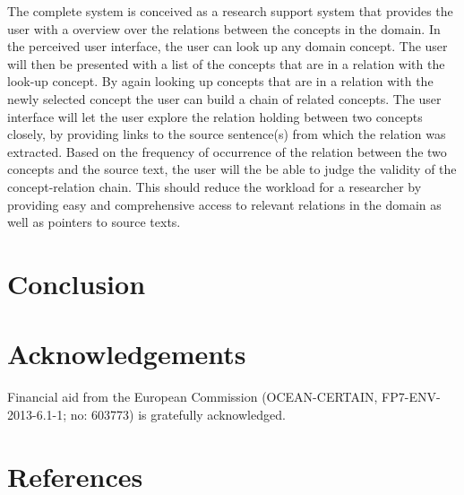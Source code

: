 \documentclass[10pt, a4paper]{article}
\begin{document}
The complete system is conceived as a research support system that provides the user with a overview over the relations between the concepts in the domain. 
In the perceived user interface, the user can look up any domain concept.
The user will then be presented with a list of the concepts that are in a relation with the look-up concept. 
By again looking up concepts that are in a relation with the newly selected concept the user can build a chain of related concepts.
The user interface will let the user explore the relation holding between two concepts closely, by providing links to the source sentence(s) from which the relation was extracted. 
Based on the frequency of occurrence of the relation between the two concepts and the source text, the user will the be able to judge the validity of the concept-relation chain.
This should reduce the workload for a researcher by providing easy and comprehensive access to relevant relations in the domain as well as pointers to source texts.

\section{Conclusion}



\section{Acknowledgements}

Financial aid from the European Commission (OCEAN-CERTAIN, FP7-ENV-2013-6.1-1; no: 603773) is gratefully acknowledged. 


\section{References}



\end{document}
